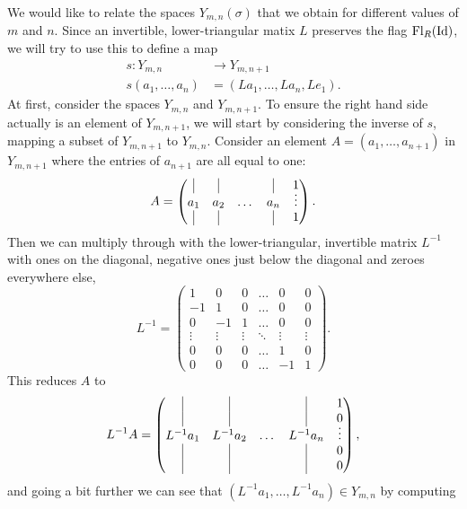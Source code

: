 We would like to relate the spaces $Y_{m,n}(\sigma)$ that we obtain
for different values of
$m$ and $n$. Since an invertible, lower-triangular matix $L$ preserves
the flag $\mathrm{Fl}_R(\operatorname{Id})$, we will try to use this to define a map
\begin{align*}
  s : Y_{m,n} &\to Y_{m,n+1} \\
  s(a_1,\dots,a_{n}) &= (La_1,\dots,La_{n},Le_1).
\end{align*}
At first, consider the spaces $Y_{m,n}$ and $Y_{m,n+1}$.
To ensure the right hand side actually is an element of $Y_{m,n+1}$,
we will start by considering the inverse of $s$, mapping a subset of
$Y_{m,n+1}$ to $Y_{m,n}$.
Consider an element $A=(a_1,\dots,a_{n+1})$ in $Y_{m,n+1}$ where
the entries of $a_{n+1}$ are all equal to one:
\[ A = 
\begin{pmatrix}
  \vrule & \vrule & & \vrule & \vspace{-0.5em}
  1 \\
  a_1 & a_2 & \dots & a_{n} & \vdots \\
  \vrule & \vrule & & \vrule & 1
\end{pmatrix}. \] 
Then we can multiply through with the lower-triangular, invertible
matrix $L^{-1}$ with ones on the diagonal, negative ones just below
the diagonal and zeroes everywhere else,
\[ L^{-1} =
\begin{pmatrix}
   1 &  0 & 0 & \dots &  0 & 0 \\
  -1 &  1 & 0 & \dots &  0 & 0 \\
   0 & -1 & 1 & \dots &  0 & 0 \\
   \vdots & \vdots & \vdots & \ddots & \vdots & \vdots \\
   0 &  0 & 0 & \dots &  1 & 0 \\
   0 &  0 & 0 & \dots & -1 & 1
\end{pmatrix}. \]
This reduces $A$ to
\[ L^{-1}A =
\begin{pmatrix}
  \vrule & \vrule & & \vrule & 
  1 \\
  \vrule & \vrule & & \vrule & \vspace{-0.5em}
  0 \\
  L^{-1}a_1 & L^{-1}a_2 & \dots & L^{-1}a_{n} & \vdots \\
  \vrule & \vrule & & \vrule & 0 \\
  \vrule & \vrule & & \vrule & 0
\end{pmatrix}, \]
and going a bit further we can see that
$(L^{-1}a_1,\dots,L^{-1}a_{n}) \in Y_{m,n}$ by computing
